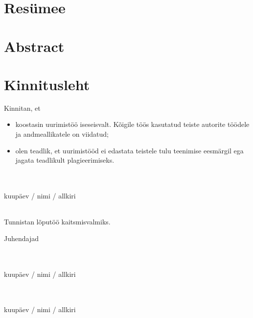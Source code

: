\documentclass[a4paper,12pt]{report}
\begin{document}
\chapter*{Resümee}

\chapter*{Abstract}

\chapter*{Kinnitusleht}
Kinnitan, et
\begin{itemize}
\item koostasin uurimistöö iseseisvalt. Kõigile töös kasutatud teiste autorite töödele ja
andmeallikatele on viidatud;
\item olen teadlik, et uurimistööd ei edastata teistele tulu teenimise eesmärgil ega jagata
teadlikult plagieerimiseks.
\end{itemize}

\flushleft
~\\\dotfill\\
kuupäev / nimi / allkiri

~\\

Tunnistan lõputöö kaitsmisvalmiks.

Juhendajad

\flushleft
~\\\dotfill\\
kuupäev / nimi / allkiri

\flushleft
~\\\dotfill\\
kuupäev / nimi / allkiri
\end{document}
